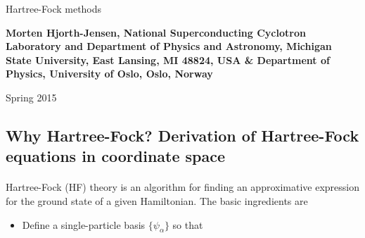 \documentclass[%
twoside,                 %
final,                   %
10pt]{article}
\begin{document}






\thispagestyle{empty}

\begin{center}
{\LARGE\bf
\begin{spacing}{1.25}
Hartree-Fock methods
\end{spacing}
}
\end{center}


\begin{center}
{\bf Morten Hjorth-Jensen, National Superconducting Cyclotron Laboratory and Department of Physics and Astronomy, Michigan State University, East Lansing, MI 48824, USA {\&} Department of Physics, University of Oslo, Oslo, Norway${}^{}$} \\ [0mm]
\end{center}

    \begin{center}
\end{center}
    

\begin{center} %
Spring 2015
\end{center}

\vspace{1cm}


\subsection{Why Hartree-Fock? Derivation of Hartree-Fock equations in coordinate space}

\paragraph{}
Hartree-Fock (HF) theory is an algorithm for finding an approximative expression for the ground state of a given Hamiltonian. The basic ingredients are
\begin{itemize}
  \item Define a single-particle basis $\{\psi_{\alpha}\}$ so that
\end{itemize}
\end{document}
